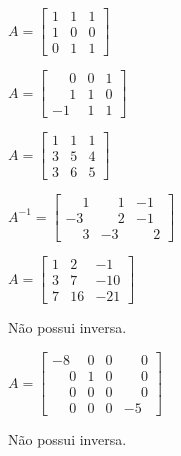 \documentclass[12pt]{exam}
\begin{document}
\begin{exercicio}
    $
    A = \begin{bmatrix}
        1 & 1 & 1\\
        1 & 0 & 0\\
        0 & 1 & 1
    \end{bmatrix}
    $
\end{exercicio}

\begin{exercicio}
    $
    A = \begin{bmatrix}
        \phantom{-}0 & 0 & 1\\
        \phantom{-}1 & 1 & 0\\
        -1 & 1 & 1
    \end{bmatrix}
    $
\end{exercicio}


\begin{exercicio}
  $
    A =\begin{bmatrix}
        1 & 1 & 1\\
        3 & 5 & 4\\
        3 & 6 & 5
      \end{bmatrix}
    $
  \begin{solucao}
    $
      A^{-1} =\begin{bmatrix}
        \phantom{-} 1 & \phantom{-} 1 & -1\\
        -3 & \phantom{-} 2 & -1\\
        \phantom{-} 3 & -3 & \phantom{-} 2
      \end{bmatrix}
    $
  \end{solucao}
\end{exercicio}

\begin{exercicio}
  $
    A =\begin{bmatrix}
        1 & 2 & -1\\
        3 & 7 & -10\\
        7 & 16 & -21
    \end{bmatrix}
  $
  \begin{solucao}
    Não possui inversa.
  \end{solucao}
\end{exercicio}

\begin{exercicio}
  $
    A =\begin{bmatrix}
        -8 & 0 & 0 & \phantom{-} 0\\
        \phantom{-} 0 & 1 & 0 & \phantom{-} 0\\
        \phantom{-} 0 & 0 & 0 & \phantom{-} 0\\
        \phantom{-} 0 & 0 & 0 & -5
    \end{bmatrix}
  $
  \begin{solucao}
   Não possui inversa.
  \end{solucao}
\end{exercicio}
\end{document}
